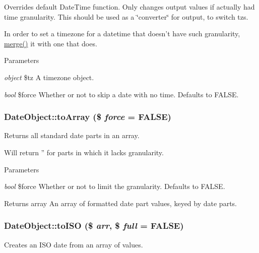 Overrides default DateTime function. Only changes output values if actually had time granularity. This should be used as a \char`\"{}converter\char`\"{} for output, to switch tzs.

In order to set a timezone for a datetime that doesn't have such granularity, \hyperlink{classDateObject_a9974bc28e7a0bc4e8fece41fa065bb53}{merge()} it with one that does.


\begin{DoxyParams}{Parameters}
\item[{\em object}]\$tz A timezone object. \item[{\em bool}]\$force Whether or not to skip a date with no time. Defaults to FALSE. \end{DoxyParams}
\hypertarget{classDateObject_a470d11f41df750e2d8ff522c33d98238}{
\subsubsection[{toArray}]{\setlength{\rightskip}{0pt plus 5cm}DateObject::toArray (\$ {\em force} = {\ttfamily FALSE})}}
\label{classDateObject_a470d11f41df750e2d8ff522c33d98238}
Returns all standard date parts in an array.

Will return '' for parts in which it lacks granularity.


\begin{DoxyParams}{Parameters}
\item[{\em bool}]\$force Whether or not to limit the granularity. Defaults to FALSE.\end{DoxyParams}
\begin{DoxyReturn}{Returns}
array An array of formatted date part values, keyed by date parts. 
\end{DoxyReturn}
\hypertarget{classDateObject_ac98a3b4209dd6df8da10e327ff501b2e}{
\subsubsection[{toISO}]{\setlength{\rightskip}{0pt plus 5cm}DateObject::toISO (\$ {\em arr}, \/  \$ {\em full} = {\ttfamily FALSE})}}
\label{classDateObject_ac98a3b4209dd6df8da10e327ff501b2e}
Creates an ISO date from an array of values.


